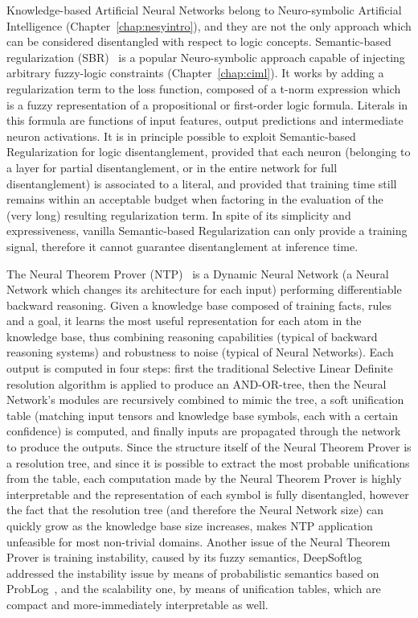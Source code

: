 Knowledge-based Artificial Neural Networks belong to Neuro-symbolic Artificial Intelligence (Chapter~\ref{chap:nesyintro}), and they are not the only approach which can be considered disentangled with respect to logic concepts.
%
Semantic-based regularization (SBR)~\cite{diligenti2017semantic} is a popular Neuro-symbolic approach capable of injecting arbitrary fuzzy-logic constraints (Chapter~\ref{chap:ciml}). It works by adding a regularization term to the loss function, composed of a t-norm expression which is a fuzzy representation of a propositional or first-order logic formula. Literals in this formula are functions of input features, output predictions and intermediate neuron activations. It is in principle possible to exploit Semantic-based Regularization for logic disentanglement, provided that each neuron (belonging to a layer for partial disentanglement, or in the entire network for full disentanglement) is associated to a literal, and provided that training time still remains within an acceptable budget when factoring in the evaluation of the (very long) resulting regularization term.
In spite of its simplicity and expressiveness, vanilla Semantic-based Regularization can only provide a training signal, therefore it cannot guarantee disentanglement at inference time. %

The Neural Theorem Prover (NTP)~\cite{rocktaschel2016learning} is a Dynamic Neural Network (a Neural Network which changes its architecture for each input) performing differentiable backward reasoning. Given a knowledge base composed of training facts, rules and a goal, it learns the most useful representation for each atom in the knowledge base, thus combining reasoning capabilities (typical of backward reasoning systems) and robustness to noise (typical of Neural Networks). Each output is computed in four steps: first the traditional Selective Linear Definite resolution algorithm is applied to produce an AND-OR-tree, then the Neural Network's modules are recursively combined to mimic the tree, a soft unification table (matching input tensors and knowledge base symbols, each with a certain confidence) is computed, and finally inputs are propagated through the network to produce the outputs. Since the structure itself of the Neural Theorem Prover is a resolution tree, and since it is possible to extract the most probable unifications from the table, each computation made by the Neural Theorem Prover is highly interpretable and the representation of each symbol is fully disentangled, however the fact that the resolution tree (and therefore the Neural Network size) can quickly grow as the knowledge base size increases, makes NTP application unfeasible for most non-trivial domains. Another issue of the Neural Theorem Prover is training instability, caused by its fuzzy semantics, DeepSoftlog~\cite{maene2024soft} addressed the instability issue by means of probabilistic semantics based on ProbLog~\cite{de2007problog}, and the scalability one, by means of unification tables, which are compact and more-immediately interpretable as well.

